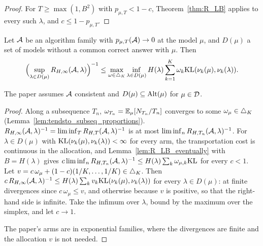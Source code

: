\begin{proof}
  \leanok
  For $T \ge \max(1, B^2)$ with $p_{\mu,T} < 1 - c$, Theorem~\ref{thm:R_LB} applies to every such
  $\lambda$, and $c \le 1 - p_{\mu,T}$.
\end{proof}

\begin{theorem}[{\cite[Theorem 3]{D23}}]
  \label{thm:asm_R_LB_limsup}
  \leanok
  Let $\mathcal{A}$ be an algorithm family with $p_{\mu,T}(\mathcal{A}) \to 0$ at the model $\mu$, and $D(\mu)$ a
  set of models without a common correct answer with $\mu$. Then
  \[ \Bigl(\sup_{\lambda \in D(\mu)} R_{H,\infty}(\mathcal{A}, \lambda)\Bigr)^{-1}
    \le \max_{\omega \in \triangle_K} \inf_{\lambda \in D(\mu)} H(\lambda) \sum_{k=1}^K \omega_k
    \mathrm{KL}(\nu_k(\mu), \nu_k(\lambda)). \]
\end{theorem}

The paper assumes $\mathcal{A}$ consistent and $D(\mu) \subseteq \mathrm{Alt}(\mu)$ for $\mu \in \mathcal{D}$.

\begin{proof}
  \leanok
  Along a subsequence $T_n$, $\omega_{T_n} = \mathbb{E}_{\mu}[N_{T_n}/T_n]$ converges to some
  $\omega_{\mu} \in \triangle_K$ (Lemma~\ref{lem:tendsto_subseq_proportions}).
  $R_{H,\infty}(\mathcal{A}, \lambda)^{-1} = \liminf_T R_{H,T}(\mathcal{A}, \lambda)^{-1}$ is at most
  $\liminf_n R_{H,T_n}(\mathcal{A}, \lambda)^{-1}$. For $\lambda \in D(\mu)$ with
  $\mathrm{KL}(\nu_k(\mu), \nu_k(\lambda)) < \infty$ for every arm, the transportation cost is continuous
  in the allocation, and Lemma~\ref{lem:R_LB_eventually} with $B = H(\lambda)$ gives
  $c \liminf_n R_{H,T_n}(\mathcal{A}, \lambda)^{-1} \le H(\lambda) \sum_k \omega_{\mu,k} \mathrm{KL}$ for every
  $c < 1$. Let $v = c \, \omega_{\mu} + (1 - c) (1/K, \dots, 1/K) \in \triangle_K$. Then
  $c \, R_{H,\infty}(\mathcal{A}, \lambda)^{-1} \le H(\lambda) \sum_k v_k \mathrm{KL}(\nu_k(\mu), \nu_k(\lambda))$
  for every $\lambda \in D(\mu)$: at finite divergences since $c \, \omega_{\mu} \le v$, and
  otherwise because $v$ is positive, so that the right-hand side is infinite. Take the infimum
  over $\lambda$, bound by the maximum over the simplex, and let $c \to 1$.

  The paper's arms are in exponential families, where the divergences are finite and the
  allocation $v$ is not needed.
\end{proof}

